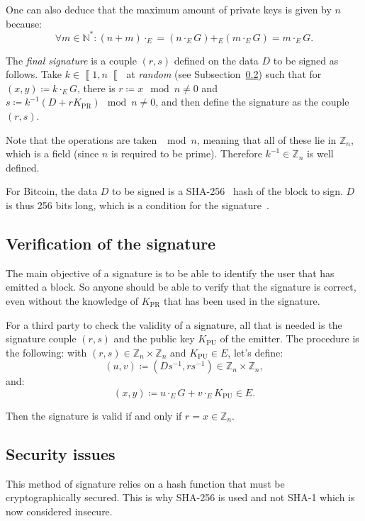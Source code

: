 \documentclass{IEEEtran}
\newcommand{\private}[1]{{#1}_{\text{PR}}}
\newcommand{\public}[1]{{#1}_{\text{PU}}}
\newcommand{\intint}[2]{\left\llbracket#1, #2\right\llbracket}
\begin{document}
	One can also deduce that the maximum amount of private keys is given by $n$ because:
	\[\forall m \in \mathbb N^*: (n+m) \cdot_E = \left(n \cdot_E G\right) +_E \left(m \cdot_E G\right) = m \cdot_E G.\]

	The \textit{final signature} is a couple $(r, s)$ defined on the data $D$ to be signed as follows.
	Take $k \in \intint 1n$ at \textit{random} (see Subsection~\ref{subsec:security issues}) such that
	for $(x, y) \coloneqq k \cdot_E G$, there is $r \coloneqq x \mod n \neq 0$ and
	$s \coloneqq k^{-1}(D + r\private K) \mod n \neq 0$, and then	define the signature as
	the couple $(r, s)$.~\cite{nist186-4}

	Note that the operations are taken $\mod n$, meaning that all of these lie in $\mathbb Z_n$, which
	is a field (since $n$ is required to be prime). Therefore $k^{-1} \in \mathbb Z_n$ is well defined.

	For Bitcoin, the data $D$ to be signed is a SHA-256~\cite{nist180-4} hash of the block to sign.
	$D$ is thus 256 bits long, which is a condition for the signature~\cite{nist186-4}.

	\subsection{Verification of the signature}
	The main objective of a signature is to be able to identify the user that has emitted a block.
	So anyone should be able to verify that the signature is correct, even without the knowledge of
	$\private K$ that has been used in the signature.

	For a third party to check the validity of a signature, all that is needed is the signature
	couple $(r, s)$ and the public key $\public K$ of the emitter. The procedure is the following:
	with $(r, s) \in \mathbb Z_n \times \mathbb Z_n$ and $\public K \in E$, let's define:
	\[(u, v) \coloneqq \left(Ds^{-1}, rs^{-1}\right) \in \mathbb Z_n \times \mathbb Z_n,\]
	and:
	\[(x, y) \coloneqq u \cdot_E G + v \cdot_E \public K \in E.\]

	Then the signature is valid if and only if $r = x \in \mathbb Z_n$.

	\subsection{Security issues}\label{subsec:security issues}
	This method of signature relies on a hash function that must be cryptographically secured.
	This is why SHA-256 is used and not SHA-1 which is now considered insecure.
\end{document}
